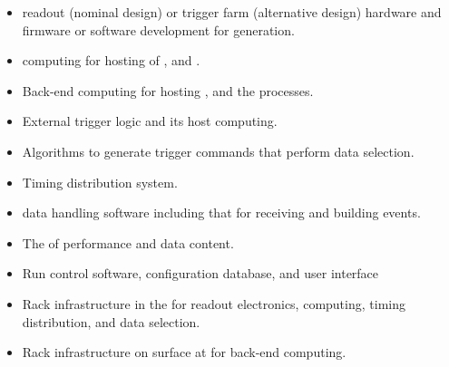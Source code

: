 \begin{itemize}
\item {} readout (nominal design) or trigger farm (alternative
  design) hardware and firmware or software development for
   generation.
\item {} computing for hosting of ,  and .
\item Back-end computing for hosting ,  and the  processes.
\item External trigger logic and its host computing.
\item Algorithms to generate trigger commands that perform data selection.
\item Timing distribution system.
\item {} data handling software including that for receiving and building 
  events.
\item The  of  performance and data content.
\item Run control software, configuration database, and user interface
\item Rack infrastructure in the  for readout
  electronics,  computing, timing distribution, and data
  selection.
\item Rack infrastructure on surface at \surf for back-end computing.
\end{itemize}
